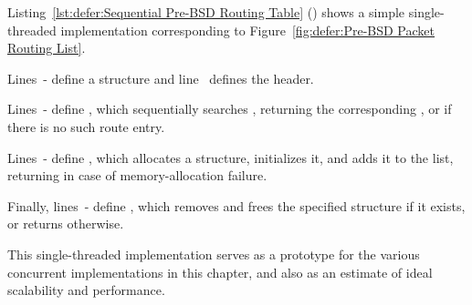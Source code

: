 Listing~\ref{lst:defer:Sequential Pre-BSD Routing Table} ()
shows a simple single-threaded implementation corresponding to
Figure~\ref{fig:defer:Pre-BSD Packet Routing List}.
\begin{lineref}
Lines~- define a  structure and
line~ defines
the  header.
\end{lineref}
\begin{lineref}
Lines~- define , which sequentially searches
, returning the corresponding , or
 if there is no such route entry.
\end{lineref}
\begin{lineref}
Lines~- define , which allocates a
 structure, initializes it, and adds it to the
list, returning  in case of memory-allocation failure.
\end{lineref}
\begin{lineref}
Finally, lines~- define , which removes and
frees the specified  structure if it exists,
or returns  otherwise.
\end{lineref}

This single-threaded implementation serves as a prototype for the various
concurrent implementations in this chapter, and also as an estimate of
ideal scalability and performance.








